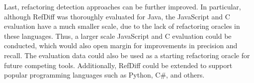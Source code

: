 Last, refactoring detection approaches can be further improved.
In particular, although RefDiff was thoroughly evaluated for Java, the JavaScript and C evaluation have a much smaller scale, due to the lack of refactoring oracles in these languages.
Thus, a larger scale JavaScript and C evaluation could be conducted, which would also open margin for improvements in precision and recall. The evaluation data could also be used as a starting refactoring oracle for future competing tools.
Additionally, RefDiff could be extended to support popular programming languages such as Python, C\#, and others.
